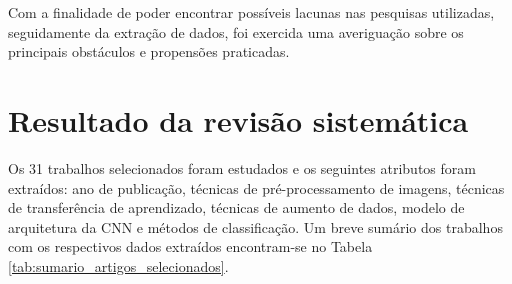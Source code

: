 \documentclass[
	12pt,				%
	oneside,			%
	a4paper,			%
	english,			%
	brazil				%
	]{abntex2ppgsi}
\begin{document}
Com a finalidade de poder encontrar possíveis lacunas nas pesquisas utilizadas, seguidamente da extração de dados, foi exercida uma averiguação sobre os principais obstáculos e propensões praticadas.

\section{Resultado da revisão sistemática}
Os 31 trabalhos selecionados foram estudados e os seguintes atributos foram extraídos: ano de publicação, técnicas de pré-processamento de imagens, técnicas de transferência de aprendizado, técnicas de aumento de dados, modelo de arquitetura da CNN e métodos de classificação. Um breve sumário dos trabalhos com os respectivos dados extraídos encontram-se no Tabela \ref{tab:sumario_artigos_selecionados}.
  
\end{document}
